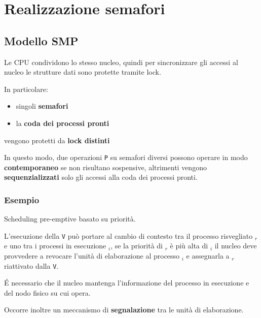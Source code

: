\section{Realizzazione semafori}

\subsection{Modello SMP}
Le CPU condividono lo stesso nucleo, quindi per sincronizzare gli accessi al nucleo le strutture dati sono protette tramite lock.

In particolare:
\begin{itemize}
    \item singoli \textbf{semafori}
    \item la \textbf{coda dei processi pronti}
\end{itemize}
vengono protetti da \textbf{lock distinti}

In questo modo, due operazioni \texttt{P} su semafori diversi possono operare in modo \textbf{contemporaneo} se non risultano sospensive, altrimenti vengono \textbf{sequenzializzati} solo gli accessi alla coda dei processi pronti.

\subsubsection{Esempio}
Scheduling pre-emptive basato su priorità.

L'esecuzione della \texttt{V} può portare al cambio di contesto tra il processo risvegliato $_r$ e uno tra i processi in esecuzione $_i$, se la priorità di $_r$ è più alta di $_i$ il nucleo deve provvedere a revocare l'unità di elaborazione al processo $_i$ e assegnarla a $_r$ riattivato dalla \texttt{V}.

É necessario che il nucleo mantenga l'informazione del processo in esecuzione e del nodo fisico su cui opera.

Occorre inoltre un meccanismo di \textbf{segnalazione} tra le unità di elaborazione.

